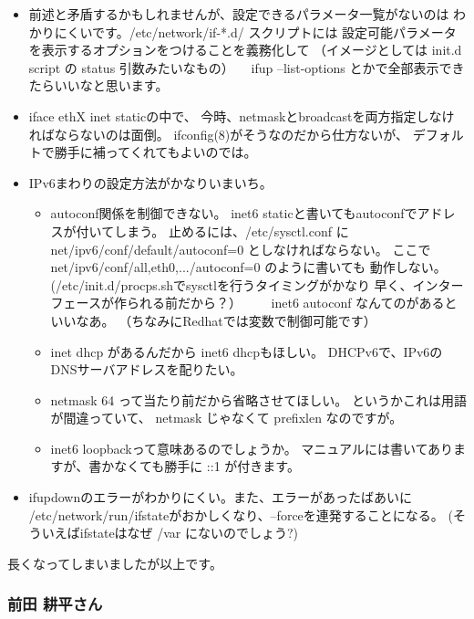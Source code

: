 \documentclass[mingoth,a4paper]{jsarticle}
\begin{document}
\begin{itemize}
 
 \item   前述と矛盾するかもしれませんが、設定できるパラメータ一覧がないのは
  わかりにくいです。/etc/network/if-*.d/ スクリプトには
  設定可能パラメータを表示するオプションをつけることを義務化して
  （イメージとしては init.d script の status 引数みたいなもの） 
 　ifup --list-options とかで全部表示できたらいいなと思います。

 \item  iface ethX inet staticの中で、
  今時、netmaskとbroadcastを両方指定しなければならないのは面倒。
  ifconfig(8)がそうなのだから仕方ないが、
  デフォルトで勝手に補ってくれてもよいのでは。

 \item  IPv6まわりの設定方法がかなりいまいち。

\begin{itemize}
 \item  autoconf関係を制御できない。
    inet6 staticと書いてもautoconfでアドレスが付いてしまう。
    止めるには、/etc/sysctl.conf に 
    net/ipv6/conf/default/autoconf=0 としなければならない。
    ここで net/ipv6/conf/{all,eth0,...}/autoconf=0 のように書いても
    動作しない。(/etc/init.d/procps.shでsysctlを行うタイミングがかなり
    早く、インターフェースが作られる前だから？）
 　　inet6 autoconf なんてのがあるといいなあ。
    （ちなみにRedhatでは変数で制御可能です）

 \item    inet dhcp があるんだから inet6 dhcpもほしい。
    DHCPv6で、IPv6のDNSサーバアドレスを配りたい。

 \item    netmask 64 って当たり前だから省略させてほしい。
    というかこれは用語が間違っていて、
    netmask じゃなくて prefixlen なのですが。

 \item  inet6 loopbackって意味あるのでしょうか。
    マニュアルには書いてありますが、書かなくても勝手に ::1 が付きます。
\end{itemize}

 \item   ifupdownのエラーがわかりにくい。また、エラーがあったばあいに
  /etc/network/run/ifstateがおかしくなり、--forceを連発することになる。
  (そういえばifstateはなぜ /var にないのでしょう?)
\end{itemize}

長くなってしまいましたが以上です。

\subsubsection{前田 耕平さん}
\end{document}
